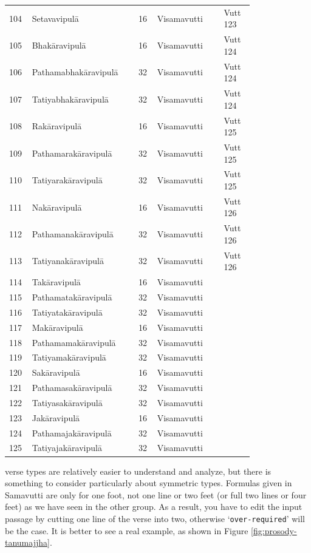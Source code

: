 \begin{longtable}[c]{p{0.05\linewidth}p{0.36\linewidth}p{0.05\linewidth}p{0.24\linewidth}p{0.1\linewidth}}
104 & Setavavipulā & 16 & Visamavutti & Vutt\,123 \\
105 & Bhakāravipulā & 16 & Visamavutti & Vutt\,124 \\
106 & \mbox{Pathamabhakāravipulā} & 32 & Visamavutti & Vutt\,124 \\
107 & Tatiyabhakāravipulā & 32 & Visamavutti & Vutt\,124 \\
108 & Rakāravipulā & 16 & Visamavutti & Vutt\,125 \\
109 & \mbox{Pathamarakāravipulā} & 32 & Visamavutti & Vutt\,125 \\
110 & Tatiyarakāravipulā & 32 & Visamavutti & Vutt\,125 \\
111 & Nakāravipulā & 16 & Visamavutti & Vutt\,126 \\
112 & \mbox{Pathamanakāravipulā} & 32 & Visamavutti & Vutt\,126 \\
113 & Tatiyanakāravipulā & 32 & Visamavutti & Vutt\,126 \\
114 & Takāravipulā & 16 & Visamavutti & \\
115 & Pathamatakāravipulā & 32 & Visamavutti & \\
116 & Tatiyatakāravipulā & 32 & Visamavutti & \\
117 & Makāravipulā & 16 & Visamavutti & \\
118 & \mbox{Pathamamakāravipulā} & 32 & Visamavutti & \\
119 & Tatiyamakāravipulā & 32 & Visamavutti & \\
120 & Sakāravipulā & 16 & Visamavutti & \\
121 & \mbox{Pathamasakāravipulā} & 32 & Visamavutti & \\
122 & Tatiyasakāravipulā & 32 & Visamavutti & \\
123 & Jakāravipulā & 16 & Visamavutti & \\
124 & Pathamajakāravipulā & 32 & Visamavutti & \\
125 & Tatiyajakāravipulā & 32 & Visamavutti & \\
\end{longtable}

 verse types are relatively easier to understand and analyze, but there is something to consider particularly about symmetric types. Formulas given in Samavutti are only for one foot, not one line or two feet (or full two lines or four feet) as we have seen in the other group. As a result, you have to edit the input passage by cutting one line of the verse into two, otherwise `\texttt{over-required}' will be the case. It is better to see a real example, as shown in Figure \ref{fig:prosody-tanumajjha}.

